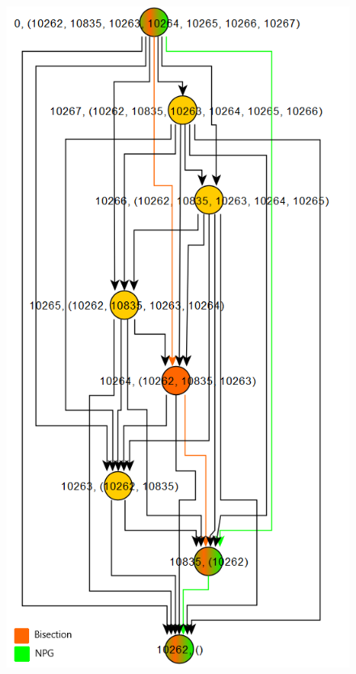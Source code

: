 \documentclass[10pt, aspectratio=169, compress, protectframetitle, handout]{beamer}
\begin{document}
\begin{frame}[noframenumbering]{}

    \begin{figure}
        \centering
        \includegraphics[scale=0.32]{figures/Policies_Bisection_NPG_3}
    \end{figure}
    
\end{frame}
\end{document}
